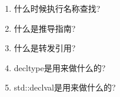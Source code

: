 \begin{enumerate}
\item
什么时候执行名称查找?

\item
什么是推导指南?

\item
什么是转发引用?

\item
decltype是用来做什么的?

\item
std::declval是用来做什么的?
\end{enumerate}